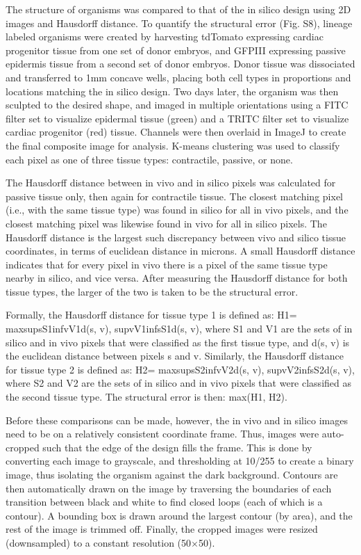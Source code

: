 The structure of organisms was compared to that of the in silico design using 2D images and Hausdorff distance. 
To quantify the structural error (Fig. S8), lineage labeled organisms were created by harvesting tdTomato expressing cardiac progenitor tissue from one set of donor embryos, and GFPIII expressing passive epidermis tissue from a second set of donor embryos. Donor tissue was dissociated and transferred to 1mm concave wells, placing both cell types in proportions and locations matching the in silico design. Two days later, the organism was then sculpted to the desired shape, and imaged in multiple orientations using a FITC filter set to visualize epidermal tissue (green) and a TRITC filter set to visualize cardiac progenitor (red) tissue. Channels were then overlaid in ImageJ to create the final composite image for analysis. K-means clustering was used to classify each pixel as one of three tissue types: contractile, passive, or none. 

The Hausdorff distance between in vivo and in silico pixels was calculated for passive tissue only, then again for contractile tissue. The closest matching pixel (i.e., with the same tissue type) was found in silico for all in vivo pixels, and the closest matching pixel was likewise found in vivo for all in silico pixels. The Hausdorff distance is the largest such discrepancy between vivo and silico tissue coordinates, in terms of euclidean distance in microns. A small Hausdorff distance indicates that for every pixel in vivo there is a pixel of the same tissue type nearby in silico, and vice versa. After measuring the Hausdorff distance for both tissue types, the larger of the two is taken to be the structural error. 

Formally, the Hausdorff distance for tissue type 1 is defined as:
H1= max{supsS1infvV1d(s, v),  supvV1infsS1d(s, v)},
where S1 and V1 are the sets of in silico and in vivo pixels that were classified as the first tissue type, and d(s, v) is the euclidean distance between pixels s and v. Similarly, the Hausdorff distance for tissue type 2 is defined as:
H2= max{supsS2infvV2d(s, v),  supvV2infsS2d(s, v)},
where S2 and V2 are the sets of in silico and in vivo pixels that were classified as the second tissue type. The structural error is then:
max(H1, H2).

Before these comparisons can be made, however, the in vivo and in silico images need to be on a relatively consistent coordinate frame. Thus, images were auto-cropped such that the edge of the design fills the frame. This is done by converting each image to grayscale, and thresholding at 10/255 to create a binary image, thus isolating the organism against the dark background. Contours are then automatically drawn on the image by traversing the boundaries of each transition between black and white to find closed loops (each of which is a contour). A bounding box is drawn around the largest contour (by area), and the rest of the image is trimmed off. Finally, the cropped images were resized (downsampled) to a constant resolution (50{$\times$}50).

